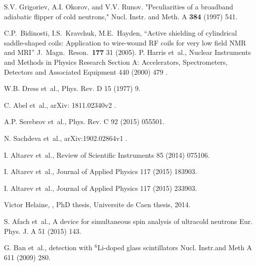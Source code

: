 \documentclass[11pt]{article}
\begin{document}
\clearpage
%
\begin{thebibliography}{9}
 S.V. Grigoriev, A.I. Okorov, and V.V. Runov. "Peculiarities of a broadband adiabatic flipper of cold neutrons," Nucl. Instr. and Meth. A {\bf 384} (1997) 541.


 C.P.\ Bidinosti, I.S.\ Kravchuk,  M.E.\ Hayden, ``Active shielding of cylindrical saddle-shaped coils: Application to wire-wound RF coils for very low field NMR and MRI''  J.\ Magn.\ Reson.\ \textbf{177} 31 (2005).
P. Harris et~al.,
\newblock Nuclear Instruments and Methods in Physics Research Section A:
  Accelerators, Spectrometers, Detectors and Associated Equipment 440 (2000)
  479 .

W.B. Dress et~al.,
\newblock Phys. Rev. D 15 (1977) 9.

C. Abel et~al.,
\newblock arXiv: 1811.02340v2 .

A.P. Serebrov et~al.,
\newblock Phys. Rev. C 92 (2015) 055501.

N. Sachdeva et~al.,
\newblock arXiv:1902.02864v1 .

I. Altarev et~al.,
\newblock Review of Scientific Instruments 85 (2014) 075106.

I. Altarev et~al.,
\newblock Journal of Applied Physics 117 (2015) 183903.

I. Altarev et~al.,
\newblock Journal of Applied Physics 117 (2015) 233903.

Victor Helaine, 
,
\newblock PhD thesis, Universite de Caen thesis, 2014.

S. Afach et~al.,
\newblock A device for simultaneous spin analysis of ultracold neutrons
\newblock Eur. Phys. J. A 51 (2015) 143.

G. Ban et~al.,
 detection with $^6${Li}-doped glass scintillators
\newblock  Nucl. Instr.and Meth A 611 (2009) 280.


\end{thebibliography}
\end{document}

